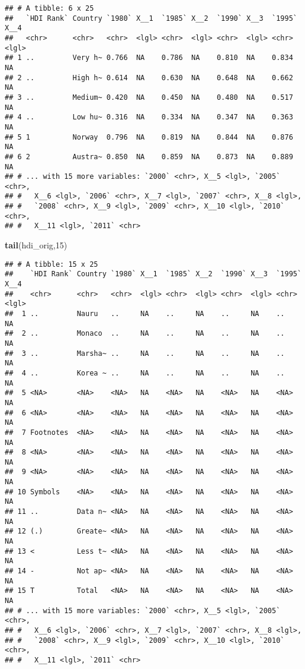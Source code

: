 \documentclass[]{article}
\newenvironment{Shaded}{\begin{snugshade}}{\end{snugshade}}
\newcommand{\KeywordTok}[1]{\textcolor[rgb]{0.13,0.29,0.53}{\textbf{#1}}}
\newcommand{\DecValTok}[1]{\textcolor[rgb]{0.00,0.00,0.81}{#1}}
\newcommand{\NormalTok}[1]{#1}
\begin{document}
\begin{verbatim}
## # A tibble: 6 x 25
##   `HDI Rank` Country `1980` X__1  `1985` X__2  `1990` X__3  `1995` X__4 
##   <chr>      <chr>   <chr>  <lgl> <chr>  <lgl> <chr>  <lgl> <chr>  <lgl>
## 1 ..         Very h~ 0.766  NA    0.786  NA    0.810  NA    0.834  NA   
## 2 ..         High h~ 0.614  NA    0.630  NA    0.648  NA    0.662  NA   
## 3 ..         Medium~ 0.420  NA    0.450  NA    0.480  NA    0.517  NA   
## 4 ..         Low hu~ 0.316  NA    0.334  NA    0.347  NA    0.363  NA   
## 5 1          Norway  0.796  NA    0.819  NA    0.844  NA    0.876  NA   
## 6 2          Austra~ 0.850  NA    0.859  NA    0.873  NA    0.889  NA   
## # ... with 15 more variables: `2000` <chr>, X__5 <lgl>, `2005` <chr>,
## #   X__6 <lgl>, `2006` <chr>, X__7 <lgl>, `2007` <chr>, X__8 <lgl>,
## #   `2008` <chr>, X__9 <lgl>, `2009` <chr>, X__10 <lgl>, `2010` <chr>,
## #   X__11 <lgl>, `2011` <chr>
\end{verbatim}

\begin{Shaded}
\begin{Highlighting}[]
\KeywordTok{tail}\NormalTok{(hdi_orig,}\DecValTok{15}\NormalTok{)}
\end{Highlighting}
\end{Shaded}

\begin{verbatim}
## # A tibble: 15 x 25
##    `HDI Rank` Country `1980` X__1  `1985` X__2  `1990` X__3  `1995` X__4 
##    <chr>      <chr>   <chr>  <lgl> <chr>  <lgl> <chr>  <lgl> <chr>  <lgl>
##  1 ..         Nauru   ..     NA    ..     NA    ..     NA    ..     NA   
##  2 ..         Monaco  ..     NA    ..     NA    ..     NA    ..     NA   
##  3 ..         Marsha~ ..     NA    ..     NA    ..     NA    ..     NA   
##  4 ..         Korea ~ ..     NA    ..     NA    ..     NA    ..     NA   
##  5 <NA>       <NA>    <NA>   NA    <NA>   NA    <NA>   NA    <NA>   NA   
##  6 <NA>       <NA>    <NA>   NA    <NA>   NA    <NA>   NA    <NA>   NA   
##  7 Footnotes  <NA>    <NA>   NA    <NA>   NA    <NA>   NA    <NA>   NA   
##  8 <NA>       <NA>    <NA>   NA    <NA>   NA    <NA>   NA    <NA>   NA   
##  9 <NA>       <NA>    <NA>   NA    <NA>   NA    <NA>   NA    <NA>   NA   
## 10 Symbols    <NA>    <NA>   NA    <NA>   NA    <NA>   NA    <NA>   NA   
## 11 ..         Data n~ <NA>   NA    <NA>   NA    <NA>   NA    <NA>   NA   
## 12 (.)        Greate~ <NA>   NA    <NA>   NA    <NA>   NA    <NA>   NA   
## 13 <          Less t~ <NA>   NA    <NA>   NA    <NA>   NA    <NA>   NA   
## 14 -          Not ap~ <NA>   NA    <NA>   NA    <NA>   NA    <NA>   NA   
## 15 T          Total   <NA>   NA    <NA>   NA    <NA>   NA    <NA>   NA   
## # ... with 15 more variables: `2000` <chr>, X__5 <lgl>, `2005` <chr>,
## #   X__6 <lgl>, `2006` <chr>, X__7 <lgl>, `2007` <chr>, X__8 <lgl>,
## #   `2008` <chr>, X__9 <lgl>, `2009` <chr>, X__10 <lgl>, `2010` <chr>,
## #   X__11 <lgl>, `2011` <chr>
\end{verbatim}
\end{document}
